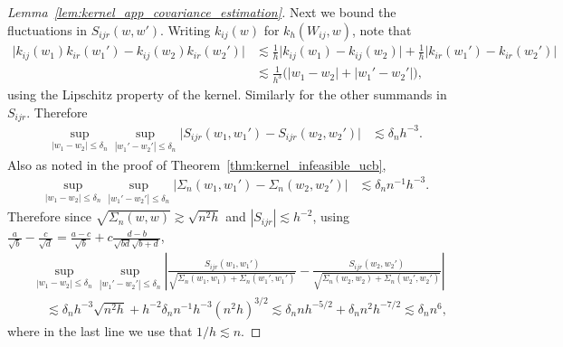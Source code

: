 \begin{proof}[Lemma~\ref{lem:kernel_app_covariance_estimation}]

  Next we bound the fluctuations in $S_{i j r}(w,w')$.
  Writing $k_{i j}(w)$ for $k_h(W_{i j},w)$,
  note that
  \begin{align*}
    \big|
    k_{i j}(w_1)
    k_{i r}(w_1')
    - k_{i j}(w_2)
    k_{i r}(w_2')
    \big|
    &\lesssim
    \frac{1}{h}
    \big| k_{i j}(w_1) - k_{i j}(w_2) \big|
    +
    \frac{1}{h}
    \big| k_{i r}(w_1') - k_{i r}(w_2') \big| \\
    &\lesssim
    \frac{1}{h^3}
    \Big(
      |w_1 - w_2|
      + |w_1' - w_2'|
    \Big),
  \end{align*}
  using the Lipschitz property of the kernel.
  Similarly for the other summands in $S_{i j r}$.
  Therefore
  \begin{align*}
    \sup_{|w_1-w_2| \leq \delta_n}
    \sup_{|w_1'-w_2'| \leq \delta_n}
    \big|
    S_{i j r}(w_1, w_1')
    - S_{i j r}(w_2, w_2')
    \big|
    &\lesssim
    \delta_n h^{-3}.
  \end{align*}
  Also as noted in the proof of Theorem~\ref{thm:kernel_infeasible_ucb},
  \begin{align*}
    \sup_{|w_1-w_2| \leq \delta_n}
    \sup_{|w_1'-w_2'| \leq \delta_n}
    \big|
    \Sigma_n(w_1,w_1')
    -
    \Sigma_n(w_2, w_2')
    \big|
    &\lesssim
    \delta_n n^{-1}h^{-3}.
  \end{align*}
  Therefore since $\sqrt{\Sigma_n(w,w)} \gtrsim \sqrt{n^2h}$
  and $|S_{i j r}| \lesssim h^{-2}$,
  using
  $\frac{a}{\sqrt b} - \frac{c}{\sqrt d}
  = \frac{a-c}{\sqrt b} + c \frac{d-b}{\sqrt{b d} \sqrt{b+d}}$,
  \begin{align*}
    &\sup_{|w_1-w_2| \leq \delta_n}
    \sup_{|w_1'-w_2'| \leq \delta_n}
    \left|
    \frac{S_{i j r}(w_1, w_1')}
    {\sqrt{\Sigma_n(w_1,w_1) + \Sigma_n(w_1',w_1')}}
    - \frac{S_{i j r}(w_2, w_2')}
    {\sqrt{\Sigma_n(w_2,w_2) + \Sigma_n(w_2',w_2')}}
    \right| \\
    &\quad\lesssim
    \delta_n h^{-3} \sqrt{n^2h}
    + h^{-2} \delta_n n^{-1} h^{-3} (n^2h)^{3/2}
    \lesssim
    \delta_n n h^{-5/2}
    + \delta_n n^{2} h^{-7/2}
    \lesssim
    \delta_n n^{6},
  \end{align*}
  where in the last line we use that
  $1/h \lesssim n$.



\end{proof}
